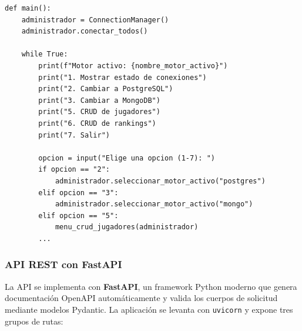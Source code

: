 \documentclass[12pt,letterpaper]{article}
\begin{document}
\begin{lstlisting}[style=pycode, caption={Fragmento del menú principal del CLI (\texttt{src/main.py})}]
def main():
    administrador = ConnectionManager()
    administrador.conectar_todos()

    while True:
        print(f"Motor activo: {nombre_motor_activo}")
        print("1. Mostrar estado de conexiones")
        print("2. Cambiar a PostgreSQL")
        print("3. Cambiar a MongoDB")
        print("5. CRUD de jugadores")
        print("6. CRUD de rankings")
        print("7. Salir")

        opcion = input("Elige una opcion (1-7): ")
        if opcion == "2":
            administrador.seleccionar_motor_activo("postgres")
        elif opcion == "3":
            administrador.seleccionar_motor_activo("mongo")
        elif opcion == "5":
            menu_crud_jugadores(administrador)
        ...
\end{lstlisting}

\subsubsection{API REST con FastAPI}

La API se implementa con \textbf{FastAPI}, un framework Python moderno que genera
documentación OpenAPI automáticamente y valida los cuerpos de solicitud mediante modelos
Pydantic. La aplicación se levanta con \texttt{uvicorn} y expone tres grupos de rutas:
\end{document}

